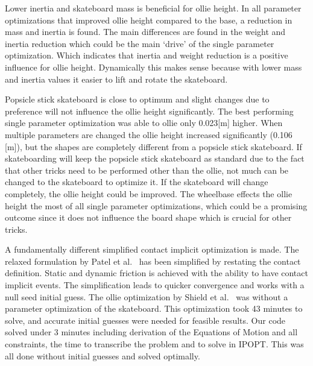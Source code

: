 \documentclass[default,iicol]{sn-jnl}
\begin{document}
Lower inertia and skateboard mass is beneficial for ollie height. In all parameter optimizations that improved ollie height compared to the base, a reduction in mass and inertia is found. The main differences are found in the weight and inertia reduction which could be the main `drive' of the single parameter optimization. Which indicates that inertia and weight reduction is a positive influence for ollie height. Dynamically this makes sense because with lower mass and inertia values it easier to lift and rotate the skateboard.

Popsicle stick skateboard is close to optimum and slight changes due to preference will not influence the ollie height significantly. The best performing single parameter optimization was able to ollie only 0.023[m] higher. When multiple parameters are changed the ollie height increased significantly (0.106 [m]), but the shapes are completely different from a popsicle stick skateboard. If skateboarding will keep the popsicle stick skateboard as standard due to the fact that other tricks need to be performed other than the ollie, not much can be changed to the skateboard to optimize it. If the skateboard will change completely, the ollie height could be improved. The wheelbase effects the ollie height the most of all single parameter optimizations, which could be a promising outcome since it does not influence the board shape which is crucial for other tricks.

A fundamentally different simplified contact implicit optimization is made. The relaxed formulation by Patel et al.~\cite{patel_contact-implicit_2019} has been simplified by restating the contact definition. Static and dynamic friction is achieved with the ability to have contact implicit events. The simplification leads to quicker convergence and works with a null seed initial guess. The ollie optimization by Shield et al.~\cite{shield_contact-implicit_2022} was without a parameter optimization of the skateboard. This optimization took 43 minutes to solve, and accurate initial guesses were needed for feasible results. Our code solved under 3 minutes including derivation of the Equations of Motion and all constraints, the time to transcribe the problem and to solve in IPOPT. This was all done without initial guesses and solved optimally.
\end{document}

